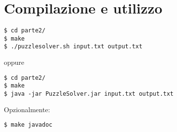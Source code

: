 \documentclass[a4paper]{article}
\begin{document}
\section{Compilazione e utilizzo}
\begin{verbatim}
$ cd parte2/ 
$ make
$ ./puzzlesolver.sh input.txt output.txt
\end{verbatim}
oppure
\begin{verbatim}
$ cd parte2/ 
$ make
$ java -jar PuzzleSolver.jar input.txt output.txt
\end{verbatim}

Opzionalmente:
\begin{verbatim}
$ make javadoc
\end{verbatim}


{}

\end{document}
